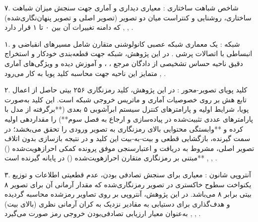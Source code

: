 

۷. شاخص شباهت ساختاری : معیاری دیداری و آماری جهت سنجش میزان شباهت ساختاری، روشنایی و کنتراست میان دو تصویر (تصویر اصلی و تصویر پنهان‌نگاری‌شده) که دامنه تغییرات آن بین ۰ تا ۱ قرار دارد , , .\par






۱. شبکه : یک معماری شبکه عصبی کانولوشنی متقارن شامل مسیرهای انقباضی  و انبساطی  با اتصالات پرشی . در این پژوهش، شبکه  جهت قطعه‌بندی خودکار و استخراج دقیق ناحیه حساس تشخیصی  از دادگان مرجع ، ،  و  آموزش دیده و ویژگی‌های آماری متمایز این ناحیه جهت محاسبه کلید پویا به کار می‌رود , .\par



۲. کلید پویای تصویر{-}محور : در این پژوهش، کلید رمزنگاری ۲۵۶ بیتی حاصل از اعمال تابع هش  بر روی خصوصیات آماری و ماتریس  خروجی شبکه  است. این کلید به‌صورت پویا، شرایط اولیه  و پارامترهای کنترل سیستم ابرآشوبی ۵ بعدی (**برگرفته از مدل  با پارامترهای عددی تثبیت‌شده در پیاده‌سازی و ارجاع به فصل سوم**) را مقداردهی اولیه کرده و **وابستگی محتوایی بالای رمزنگاری به تصویر ورودی را تحقق می‌بخشد؛ در سمت گیرنده، بازگشایی قطعی و بیت‑به‑بیت این کلید و در نتیجه بازسازی بدون اتلاف تصویر اصلی، مشروط به دریافت و اعتبارسنجی موفق پرونده کمکی احرازهویت‌شده () مبتنی بر رمزنگاری متقارن احرازهویت‌شده () در پایانه گیرنده است** , , .\par



۳. آنتروپی شانون : معیاری برای سنجش تصادفی بودن، عدم قطعیتی اطلاعات و توزیع یکنواخت سطوح خاکستری در تصویر رمزنگاری‌شده که مقدار آرمانی آن برای تصویر ۸ بیتی برابر ۸ می‌باشد. در این پژوهش، آنتروپی بر روی تصاویر رمزشده محاسبه گردیده و هدف‌گذاری برای دستیابی به مقادیر نزدیک به کران آرمانی نظری (بالای  بیت) به‌عنوان معیار ارزیابی تصادفی‌بودن خروجی رمز صورت می‌گیرد , , .\par

